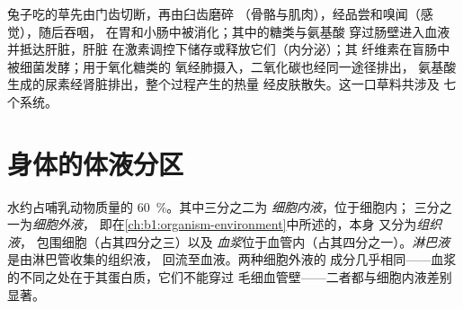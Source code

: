 \begin{example}[一口草料]\label{ex:b1:mammal-organization:mouthful}
兔子吃的草先由门齿切断，再由臼齿磨碎
（骨骼与肌肉），经品尝和嗅闻（感觉），随后吞咽，
在胃和小肠中被消化；其中的糖类与氨基酸
穿过肠壁进入血液并抵达肝脏，肝脏
在激素调控下储存或释放它们（内分泌）；其
纤维素在盲肠中被细菌发酵；用于氧化糖类的
氧经肺摄入，二氧化碳也经同一途径排出，
氨基酸生成的尿素经肾脏排出，整个过程产生的热量
经皮肤散失。这一口草料共涉及
七个系统。
\end{example}

\section{身体的体液分区}

\begin{definition}[体液分区]\label{def:b1:mammal-organization:compartments}
水约占哺乳动物质量的 \qty{60}{\%}。其中三分之二为
\emph{细胞内液}，位于细胞内；
三分之一为\emph{细胞外液}，
即在\cref{ch:b1:organism-environment}中所述的，本身
又分为\emph{组织液}，
包围细胞（占其四分之三）以及
\emph{血浆}位于血管内（占其四分之一）。\emph{淋巴液}
是由淋巴管收集的组织液，
回流至血液。两种细胞外液的
成分几乎相同——血浆的不同之处在于其蛋白质，它们不能穿过
毛细血管壁——二者都与细胞内液差别显著。
\end{definition}


